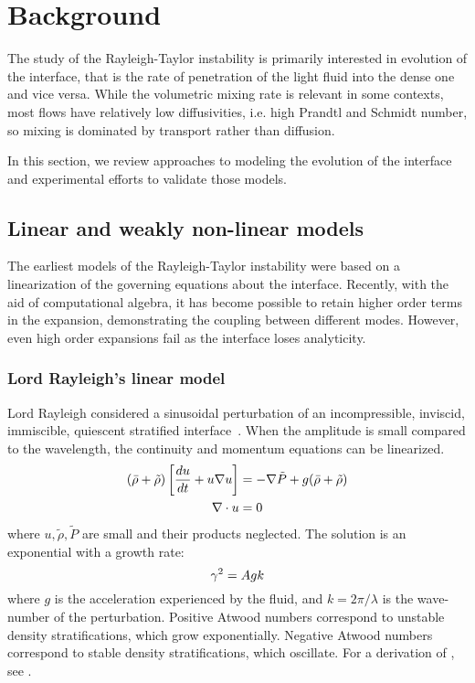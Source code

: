 \chapter{Background}

The study of the Rayleigh-Taylor instability is primarily interested in evolution of the interface, that is the rate of penetration of the light fluid into the dense one and vice versa.
While the volumetric mixing rate is relevant in some contexts, most flows have relatively low diffusivities, i.e. high Prandtl and Schmidt number, so mixing is dominated by transport rather than diffusion.

In this section, we review approaches to modeling the evolution of the interface and experimental efforts to validate those models.


\section{Linear and weakly non-linear models} %

The earliest models of the Rayleigh-Taylor instability were based on a linearization of the governing equations about the interface.
Recently, with the aid of computational algebra, it has become possible to retain higher order terms in the expansion, demonstrating the coupling between different modes.
However, even high order expansions fail as the interface loses analyticity.

\subsection{Lord Rayleigh's linear model}

Lord Rayleigh considered a sinusoidal perturbation of an incompressible, inviscid, immiscible, quiescent stratified interface~\cite{Rayleigh1883}.
When the amplitude is small compared to the wavelength, the continuity and momentum equations can be linearized.
\begin{align}
\left(\bar\rho + \tilde\rho\right) \left[\frac{d u}{d t} + u \nabla u \right] &= - \nabla{\tilde{P}} + g(\bar\rho + \tilde\rho)\\
\nabla \cdot u &= 0 \\
\end{align}
where $u, \tilde\rho, \tilde{P}$ are small and their products neglected.
The solution is an exponential with a growth rate:
\begin{equation} \elabel{simple_growth}
  \gamma^2 = A g k 
\end{equation}
where $g$ is the acceleration experienced by the fluid, and
$k = 2 \pi / \lambda$ is the wave-number of the perturbation.
Positive Atwood numbers correspond to unstable density stratifications, which grow exponentially.
Negative Atwood numbers correspond to stable density stratifications, which oscillate.
For a derivation of , see .

